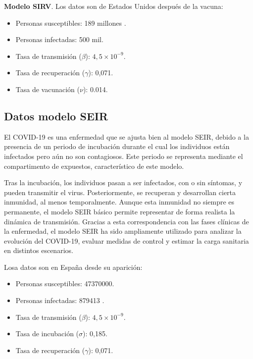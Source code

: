 \vspace{2em}
\textbf{Modelo SIRV}. 
Los datos son de Estados Unidos después de la vacuna:
\begin{itemize}
    \item Personas susceptibles: 189 millones .
    \item Personas infectadas: 500 mil.
    \item Tasa de transmisión ($\beta$): $4,5 \times 10^{-9}$.
    \item Tasa de recuperación ($\gamma$): 0,071. 
    \item Tasa de vacunación ($\nu$): 0.014.
\end{itemize}




\subsection{Datos modelo SEIR}
El COVID-19 es una enfermedad que se ajusta bien al modelo SEIR, debido a la presencia de un periodo de incubación durante el cual los individuos están infectados pero aún no son contagiosos. Este periodo se representa mediante el compartimento de expuestos, característico de este modelo.

Tras la incubación, los individuos pasan a ser infectados, con o sin síntomas, y pueden transmitir el virus. Posteriormente, se recuperan y desarrollan cierta inmunidad, al menos temporalmente. Aunque esta inmunidad no siempre es permanente, el modelo SEIR básico permite representar de forma realista la dinámica de transmisión.
Gracias a esta correspondencia con las fases clínicas de la enfermedad, el modelo SEIR ha sido ampliamente utilizado para analizar la evolución del COVID-19, evaluar medidas de control y estimar la carga sanitaria en distintos escenarios.

Losa datos son en España desde su aparición:
\begin{itemize}
    \item Personas susceptibles: 47370000.
    \item Personas infectadas: 879413 .
    \item Tasa de transmisión ($\beta$): $4,5 \times 10^{-9}$.
    \item Tasa de incubación ($\sigma$): 0,185.
    \item Tasa de recuperación ($\gamma$): 0,071.  
\end{itemize}

\vspace{2em}


